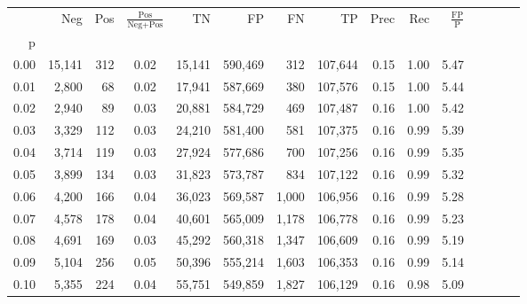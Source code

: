 \begin{tabular}{rrrcrrrrrrrrrrr}
\toprule
{} &     Neg &    Pos & $\frac{\text{Pos}}{\text{Neg}+\text{Pos}}$ &       TN &       FP &       FN &       TP &  Prec &   Rec & $\frac{\text{FP}}{\text{P}}$ \\
p    &         &        &                                            &          &          &          &          &       &       &                              \\
\midrule
0.00 &  15,141 &    312 &                                       0.02 &   15,141 &  590,469 &      312 &  107,644 &  0.15 &  1.00 &                         5.47 \\
0.01 &   2,800 &     68 &                                       0.02 &   17,941 &  587,669 &      380 &  107,576 &  0.15 &  1.00 &                         5.44 \\
0.02 &   2,940 &     89 &                                       0.03 &   20,881 &  584,729 &      469 &  107,487 &  0.16 &  1.00 &                         5.42 \\
0.03 &   3,329 &    112 &                                       0.03 &   24,210 &  581,400 &      581 &  107,375 &  0.16 &  0.99 &                         5.39 \\
0.04 &   3,714 &    119 &                                       0.03 &   27,924 &  577,686 &      700 &  107,256 &  0.16 &  0.99 &                         5.35 \\
0.05 &   3,899 &    134 &                                       0.03 &   31,823 &  573,787 &      834 &  107,122 &  0.16 &  0.99 &                         5.32 \\
0.06 &   4,200 &    166 &                                       0.04 &   36,023 &  569,587 &    1,000 &  106,956 &  0.16 &  0.99 &                         5.28 \\
0.07 &   4,578 &    178 &                                       0.04 &   40,601 &  565,009 &    1,178 &  106,778 &  0.16 &  0.99 &                         5.23 \\
0.08 &   4,691 &    169 &                                       0.03 &   45,292 &  560,318 &    1,347 &  106,609 &  0.16 &  0.99 &                         5.19 \\
0.09 &   5,104 &    256 &                                       0.05 &   50,396 &  555,214 &    1,603 &  106,353 &  0.16 &  0.99 &                         5.14 \\
0.10 &   5,355 &    224 &                                       0.04 &   55,751 &  549,859 &    1,827 &  106,129 &  0.16 &  0.98 &                         5.09 \\

\end{tabular}

